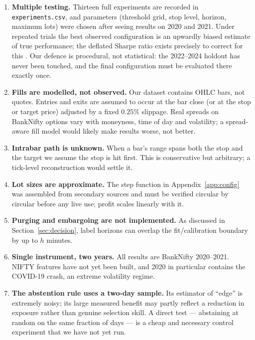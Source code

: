 \documentclass[11pt,a4paper]{article}
\newcommand{\code}[1]{\texttt{#1}}
\begin{document}
\begin{enumerate}
  \item \textbf{Multiple testing.} Thirteen full experiments are recorded in
        \code{experiments.csv}, and parameters (threshold grid, stop level, horizon,
        maximum lots) were chosen after seeing results on 2020 and 2021. Under repeated
        trials the best observed configuration is an upwardly biased estimate of true
        performance; the deflated Sharpe ratio exists precisely to correct for this
        \cite{deflatedsharpe,bailey}. Our defence is procedural, not statistical: the
        2022--2024 holdout has never been touched, and the final configuration must be
        evaluated there exactly once.
  \item \textbf{Fills are modelled, not observed.} Our dataset contains OHLC bars, not
        quotes. Entries and exits are assumed to occur at the bar close (or at the stop
        or target price) adjusted by a fixed $0.25\%$ slippage. Real spreads on BankNifty
        options vary with moneyness, time of day and volatility; a spread-aware fill model
        would likely make results worse, not better.
  \item \textbf{Intrabar path is unknown.} When a bar's range spans both the stop and the
        target we assume the stop is hit first. This is conservative but arbitrary; a
        tick-level reconstruction would settle it.
  \item \textbf{Lot sizes are approximate.} The step function in
        Appendix~\ref{app:config} was assembled from secondary sources and must be
        verified circular by circular \cite{nsecircular} before any live use; profit
        scales linearly with it.
  \item \textbf{Purging and embargoing are not implemented.} As discussed in
        Section~\ref{sec:decision}, label horizons can overlap the fit/calibration
        boundary by up to $h$ minutes.
  \item \textbf{Single instrument, two years.} All results are BankNifty 2020--2021.
        NIFTY features have not yet been built, and 2020 in particular contains the
        COVID-19 crash, an extreme volatility regime.
  \item \textbf{The abstention rule uses a two-day sample.} Its estimator of ``edge''
        is extremely noisy; its large measured benefit may partly reflect a reduction in
        exposure rather than genuine selection skill. A direct test --- abstaining at
        random on the same fraction of days --- is a cheap and necessary control
        experiment that we have not yet run.
\end{enumerate}
\end{document}
